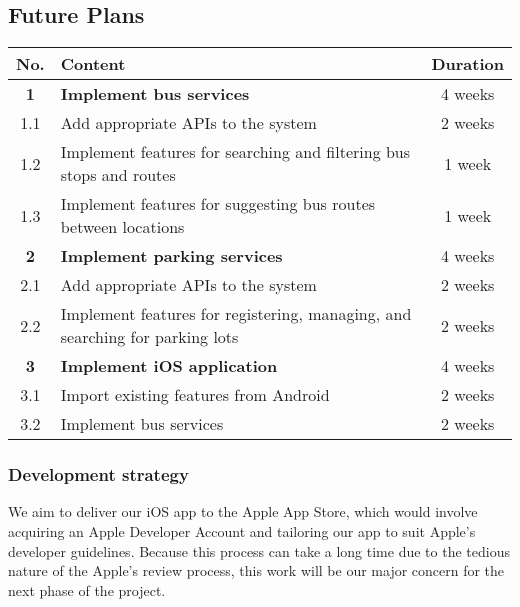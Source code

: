     
\subsection{Future Plans}

\begin{table}[H]
    \centering
    \begin{tabularx}{\textwidth}{| c | X | c |}
        \hline
        No.     &       \centering Content                                                              &   Duration    \\ \hline
        \textbf{1}       &       \centering \textbf{Implement bus services}                             &   4 weeks     \\ \hline
        1.1     &       Add appropriate APIs to the system                                              &   2 weeks     \\ \hline
        1.2     &       Implement features for searching and filtering bus stops and routes             &   1 week      \\ \hline
        1.3     &       Implement features for suggesting bus routes between locations                  &   1 week      \\ \hline
        \textbf{2}       &       \centering \textbf{Implement parking services}                         &   4 weeks     \\ \hline
        2.1     &       Add appropriate APIs to the system                                              &   2 weeks     \\ \hline
        2.2     &       Implement features for registering, managing, and searching for parking lots    &   2 weeks     \\ \hline
        \textbf{3}       &       \centering \textbf{Implement iOS application}                          &   4 weeks     \\ \hline
        3.1     &       Import existing features from Android                                           &   2 weeks     \\ \hline
        3.2     &       Implement bus services                                                          &   2 weeks     \\ \hline
    \end{tabularx}
\end{table}

\subsubsection{Development strategy}
We aim to deliver our iOS app to the Apple App Store, which would involve acquiring an Apple Developer Account and tailoring our app to suit Apple's developer guidelines. Because this process can take a long time due to the tedious nature of the Apple's review process, this work will be our major concern for the next phase of the project. 

